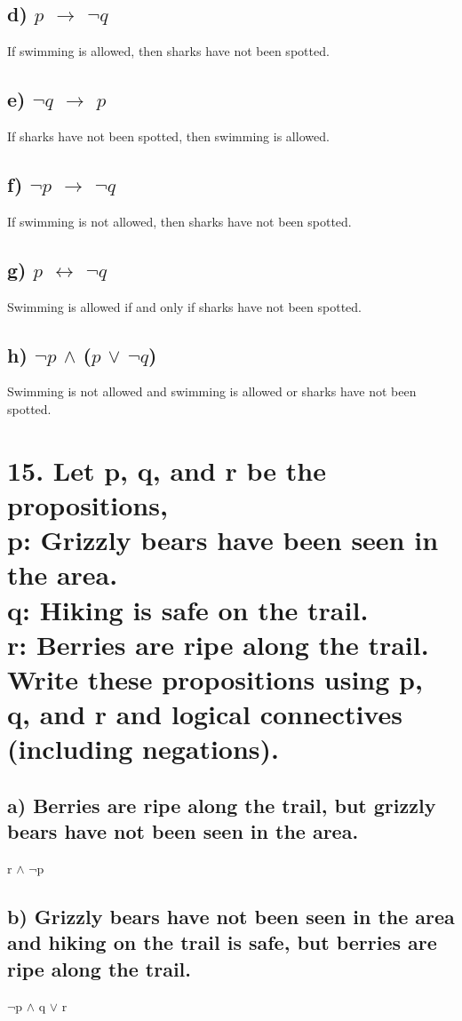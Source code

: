 \documentclass[11pt, oneside]{article} %
\numberwithin{equation}{section} %
\numberwithin{figure}{section} %
\numberwithin{table}{section} %
\begin{document}
\subsection{d) $p$ $\rightarrow$ $\neg$$q$}
If swimming is allowed, then sharks have not been spotted.
\subsection{e) $\neg$$q$ $\rightarrow$ $p$}
If sharks have not been spotted, then swimming is allowed.
\subsection{f) $\neg$$p$ $\rightarrow$ $\neg$$q$}
If swimming is not allowed, then sharks have not been spotted.
\subsection{g) $p$ $\leftrightarrow$ $\neg$$q$}
Swimming is allowed if and only if sharks have not been spotted.
\subsection{h) $\neg$$p$ $\wedge$ ($p$ $\vee$ $\neg$$q$)}
Swimming is not allowed and swimming is allowed or sharks have not been spotted.

\section{15. Let p, q, and r be the propositions,\\
p: Grizzly bears have been seen in the area.\\
q: Hiking is safe on the trail.\\
r: Berries are ripe along the trail.\\
Write these propositions using p, q, and r and logical connectives (including negations).}
\subsection{a) Berries are ripe along the trail, but grizzly bears have not been seen in the area.}
r $\wedge$ $\neg$p
\subsection{b) Grizzly bears have not been seen in the area and hiking on the trail is safe, but berries are ripe along the trail.}
$\neg$p $\wedge$ q $\vee$ r
\end{document}
